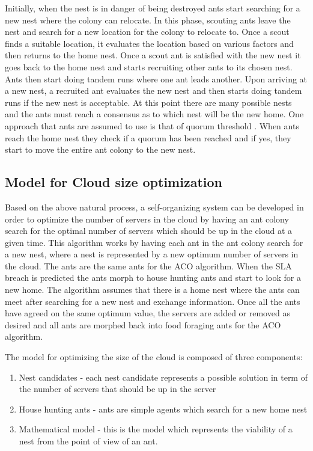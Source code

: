 \documentclass[conference]{IEEEtran}
\begin{document}
Initially, when the nest is in danger of being destroyed ants start searching for a new nest where the colony can relocate. In this phase, scouting ants leave the nest and search for a new location for the colony to relocate to. Once a scout finds a suitable location, it evaluates the location based on various factors and then returns to the home nest. Once a scout ant is satisfied with the new nest it goes back to the home nest and starts recruiting other ants to its chosen nest. Ants then start doing tandem runs where one ant leads another. Upon arriving at a new nest, a recruited ant evaluates the new nest and then starts doing tandem runs if the new nest is acceptable. At this point there are many possible nests and the ants must reach a consensus as to which nest will be the new home. One approach that ants are assumed to use is that of quorum threshold \cite{selforg:ant-quorum}. When ants reach the home nest they check if a quorum has been reached and if yes, they start to move the entire ant colony to the new nest.

\subsection{Model for Cloud size optimization}

Based on the above natural process, a self-organizing system can be developed in order to optimize the number of servers in the cloud by having an ant colony search for the optimal number of servers which should be up in the cloud at a given time. This algorithm works by having each ant in the ant colony search for a new nest, where a nest is represented by a new optimum number of servers in the cloud. The ants are the same ants for the ACO algorithm. When the SLA breach is predicted the ants morph to house hunting ants and start to look for a new home. The algorithm assumes that there is a home nest where the ants can meet after searching for a new nest and exchange information. Once all the ants have agreed on the same optimum value, the servers are added or removed as desired and all ants are morphed back into food foraging ants for the ACO algorithm.

The model for optimizing the size of the cloud is composed of three components:

\begin{enumerate}
	\item Nest candidates - each nest candidate represents a possible solution in term of the number of servers that should be up in the server
	\item House hunting ants - ants are simple agents which search for a new home nest
	\item Mathematical model - this is the model which represents the viability of a nest from the point of view of an ant.
\end{enumerate}
\end{document}
